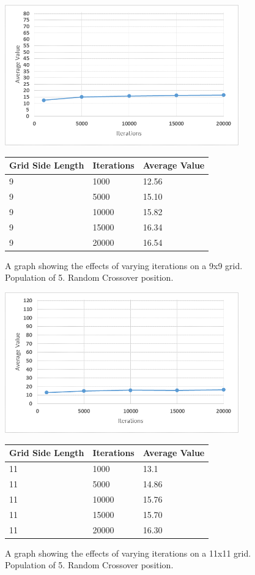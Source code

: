 \documentclass[12pt]{article}
\begin{document}
\begin{figure}[H]
    \centering
    \includegraphics[width=0.9\textwidth]{9x9_GA_Iteration}
\begin{tabular}{ |p{4cm}||p{4cm}|p{4cm}|  }
 \hline
Grid Side Length&Iterations&Average Value\\
 \hline
9&1000&12.56\\
9&5000&15.10\\
9&10000&15.82\\
9&15000&16.34\\
9&20000&16.54\\
 \hline
\end{tabular}
    \caption{A graph showing the effects of varying iterations on a 9x9 grid. Population of 5. Random Crossover position.}
    \label{fig:GApop7x7}
\end{figure}

\begin{figure}[H]
    \centering
    \includegraphics[width=0.9\textwidth]{11x11_GA_Iteration}
\begin{tabular}{ |p{4cm}||p{4cm}|p{4cm}|  }
 \hline
Grid Side Length&Iterations&Average Value\\
 \hline
11&1000&13.1\\
11&5000&14.86\\
11&10000&15.76\\
11&15000&15.70\\
11&20000&16.30\\
 \hline
\end{tabular}
    \caption{A graph showing the effects of varying iterations on a 11x11 grid. Population of 5. Random Crossover position.}
    \label{fig:GApop11x11}
\end{figure}
\end{document}
